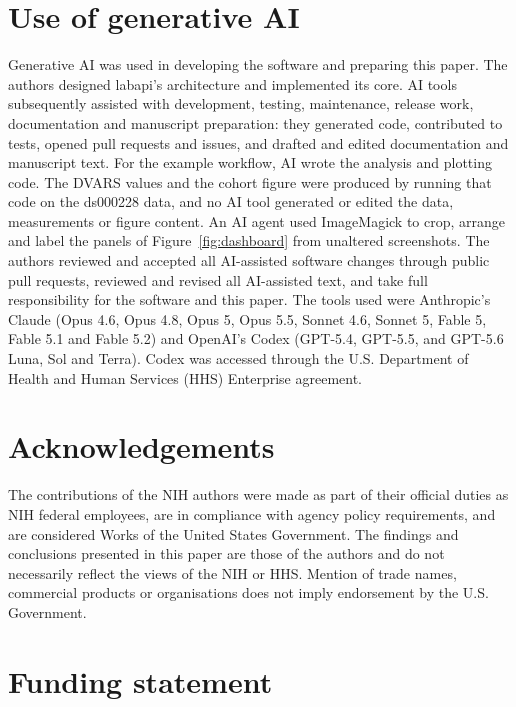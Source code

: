 \documentclass{jors}
\begin{document}
\section*{Use of generative AI}

Generative AI was used in developing the software and preparing this paper.
The authors designed labapi's architecture and implemented its
core. AI tools subsequently assisted with development, testing, maintenance,
release work, documentation and manuscript preparation: they generated code,
contributed to tests, opened pull requests and issues, and drafted and
edited documentation and manuscript text. For the example workflow, AI
wrote the analysis and plotting code. The DVARS values and the cohort
figure were produced by running that code on the ds000228 data, and no AI
tool generated or edited the data, measurements or figure content. An AI
agent used ImageMagick to crop, arrange and label the panels of
Figure~\ref{fig:dashboard} from unaltered screenshots. The authors
reviewed and accepted all AI-assisted software changes through public pull
requests, reviewed and revised all AI-assisted text, and take full
responsibility for the software and this paper. The tools used were
Anthropic's Claude (Opus 4.6, Opus 4.8, Opus 5, Opus 5.5, Sonnet 4.6,
Sonnet 5, Fable 5, Fable 5.1 and Fable 5.2) and OpenAI's Codex (GPT-5.4, GPT-5.5, and
GPT-5.6 Luna, Sol and Terra). Codex was accessed through the U.S.
Department of Health and Human Services (HHS) Enterprise agreement.

\section*{Acknowledgements}

The contributions of the NIH authors were made as part of their official
duties as NIH federal employees, are in compliance with agency policy
requirements, and are considered Works of the United States Government. The
findings and conclusions presented in this paper are those of the authors
and do not necessarily reflect the views of the NIH or HHS. Mention of
trade names, commercial products or organisations does not imply
endorsement by the U.S. Government.

\section*{Funding statement}
\end{document}

